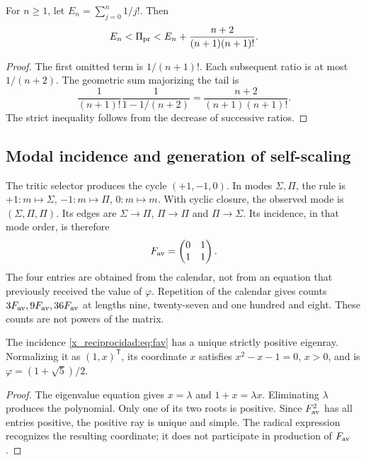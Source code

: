 \begin{proposition}
For \(n\ge1\), let \(E_n=\sum_{j=0}^n1/j!\). Then
\[
 E_n<\Pi_{\rm pr}<E_n+\frac{n+2}{(n+1)(n+1)!}.
\]
\end{proposition}
\begin{proof}
The first omitted term is \(1/(n+1)!\). Each subsequent ratio is at most \(1/(n+2)\). The geometric sum majorizing the tail is
\[
 \frac1{(n+1)!}\frac1{1-1/(n+2)}
 =\frac{n+2}{(n+1)(n+1)!}.
\]
The strict inequality follows from the decrease of successive ratios.
\end{proof}

\subsection{Modal incidence and generation of self-scaling}

The tritic selector produces the cycle \((+1,-1,0)\). In modes \(\Sigma,\Pi\), the rule is \(+1:m\mapsto\Sigma\), \(-1:m\mapsto\Pi\), \(0:m\mapsto m\). With cyclic closure, the observed mode is \((\Sigma,\Pi,\Pi)\). Its edges are \(\Sigma\to\Pi\), \(\Pi\to\Pi\) and \(\Pi\to\Sigma\). Its incidence, in that mode order, is therefore
\begin{equation}
 F_{\rm av}=\begin{pmatrix}0&1\\1&1\end{pmatrix}.
 \label{x_reciprocidad:eq:fav}
\end{equation}
The four entries are obtained from the calendar, not from an equation that previously received the value of \(\varphi\). Repetition of the calendar gives counts \(3F_{\rm av},9F_{\rm av},36F_{\rm av}\) at lengths nine, twenty-seven and one hundred and eight. These counts are not powers of the matrix.

\begin{theorem}
The incidence \eqref{x_reciprocidad:eq:fav} has a unique strictly positive eigenray. Normalizing it as \((1,x)^{\mathsf T}\), its coordinate \(x\) satisfies \(x^2-x-1=0\), \(x>0\), and is \(\varphi=(1+\sqrt5)/2\).
\end{theorem}
\begin{proof}
The eigenvalue equation gives \(x=\lambda\) and \(1+x=\lambda x\). Eliminating \(\lambda\) produces the polynomial. Only one of its two roots is positive. Since \(F_{\rm av}^2\) has all entries positive, the positive ray is unique and simple. The radical expression recognizes the resulting coordinate; it does not participate in production of \(F_{\rm av}\).
\end{proof}

